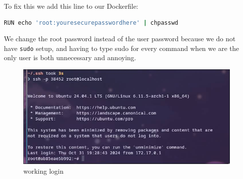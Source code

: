 \documentclass[a4paper]{article}
\newcommand{\abc}{\hfill \break}
\begin{document}
To fix this we add this line to our Dockerfile:
\begin{lstlisting}[language=bash]
RUN echo 'root:youresecurepasswordhere' | chpasswd
\end{lstlisting}
We change the root password instead of the user password because we do not have \texttt{sudo} setup, and having to type sudo for every command when we are the only user is both unnecessary and annoying. 
\begin{figure}[h]
	\centering
	\includegraphics[scale=0.4]{images/workinglogin.png}
	\caption{working login}
\end{figure} \abc
\newpage
\end{document}
